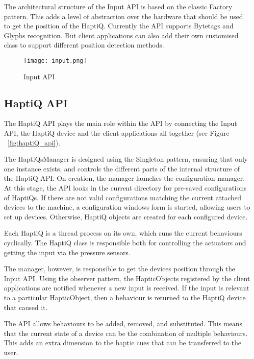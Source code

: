 The architectural structure of the Input API is based on the classic Factory pattern. This adds a level of abstraction over the hardware that should be used to get the position of the HaptiQ. Currently the API supports Bytetags and Glyphs recognition. But client applications can also add their own customised class to support different position detection methods. 

\begin{figure}[H]
  \centering
  \texttt{[image: input.png]}
  \caption{Input API}
  \label{fig:input_api}
\end{figure}

\subsection{HaptiQ API}

The HaptiQ API plays the main role within the API by connecting the Input API, the HaptiQ device and the client applications all together (see Figure ~\ref{fig:haptiQ_api}). 

The HaptiQsManager is designed using the Singleton pattern, ensuring that only one instance exists, and controls the different parts of the internal structure of the HaptiQ API. On creation, the manager launches the configuration manager. At this stage, the API looks in the current directory for pre-saved configurations of HaptiQs. If there are not valid configurations matching the current attached devices to the machine, a configuration windows form is started, allowing users to set up devices. Otherwise, HaptiQ objects are created for each configured device. 

Each HaptiQ is a thread process on its own, which runs the current behaviours cyclically. The HaptiQ class is responsible both for controlling the actuators and getting the input via the pressure sensors. 

The manager, however, is responsible to get the devices position through the Input API. Using the observer pattern, the HapticObjects registered by the client applications are notified whenever a new input is received. If the input is relevant to a particular HapticObject, then a behaviour is returned to the HaptiQ device that caused it. 

The API allows behaviours to be added, removed, and substituted. This means that the current state of a device can be the combination of multiple behaviours. This adds an extra dimension to the haptic cues that can be transferred to the user. 

